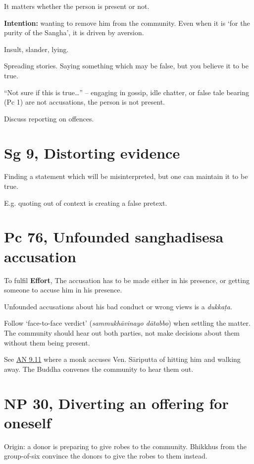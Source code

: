 It matters whether the person is present or not.

\textbf{Intention:} wanting to remove him from the community. Even when
it is `for the purity of the Sangha', it is driven by aversion.

Insult, slander, lying.

Spreading stories. Saying something which may be false, but you believe
it to be true.

``Not sure if this is true\ldots{}'' -- engaging in gossip, idle
chatter, or false tale bearing (Pc 1) are not accusations, the person is
not present.

Discuss reporting on offences.

\section{Sg 9, Distorting evidence}

Finding a statement which will be misinterpreted, but one can maintain
it to be true.

E.g. quoting out of context is creating a false pretext.

\section{Pc 76, Unfounded sanghadisesa accusation}

To fulfil \textbf{Effort}, The accusation has to be made either in his
presence, or getting someone to accuse him in his presence.

Unfounded accusations about his bad conduct or wrong views is a
\emph{dukkaṭa}.

Follow `face-to-face verdict' (\emph{sammukhāvinayo dātabbo}) when
settling the matter. The community should hear out both parties, not
make decisions about them without them being present.

See \href{https://suttacentral.net/an9.11/en/sujato}{AN 9.11} where a
monk accuses Ven. Sāriputta of hitting him and walking away. The Buddha
convenes the community to hear them out.

\section{NP 30, Diverting an offering for oneself}

Origin: a donor is preparing to give robes to the community. Bhikkhus
from the group-of-six convince the donors to give the robes to them
instead.

